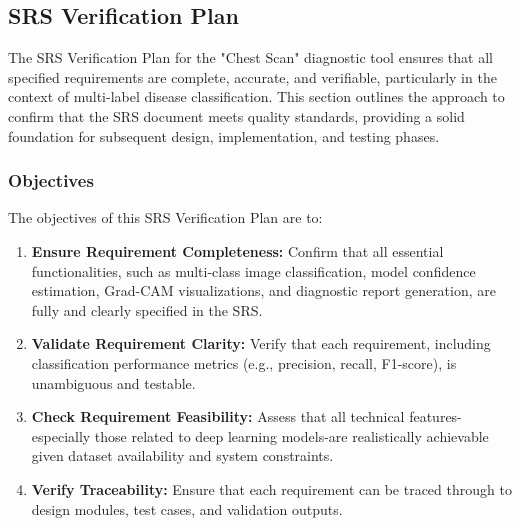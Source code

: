 \documentclass[12pt, titlepage]{article}
\begin{document}
\pagebreak

\subsection{SRS Verification Plan}


The SRS Verification Plan for the "Chest Scan" diagnostic tool ensures that all specified requirements are complete, accurate, and verifiable, particularly in the context of multi-label disease classification. This section outlines the approach to confirm that the SRS document meets quality standards, providing a solid foundation for subsequent design, implementation, and testing phases.

\subsubsection{Objectives}
The objectives of this SRS Verification Plan are to:
\begin{enumerate}
  \item \textbf{Ensure Requirement Completeness:} Confirm that all essential functionalities, such as multi-class image classification, model confidence estimation, Grad-CAM visualizations, and diagnostic report generation, are fully and clearly specified in the SRS.
  \item \textbf{Validate Requirement Clarity:} Verify that each requirement, including classification performance metrics (e.g., precision, recall, F1-score), is unambiguous and testable.
  \item \textbf{Check Requirement Feasibility:} Assess that all technical features-especially those related to deep learning models-are realistically achievable given dataset availability and system constraints.
  \item \textbf{Verify Traceability:} Ensure that each requirement can be traced through to design modules, test cases, and validation outputs.
\end{enumerate}
\end{document}
